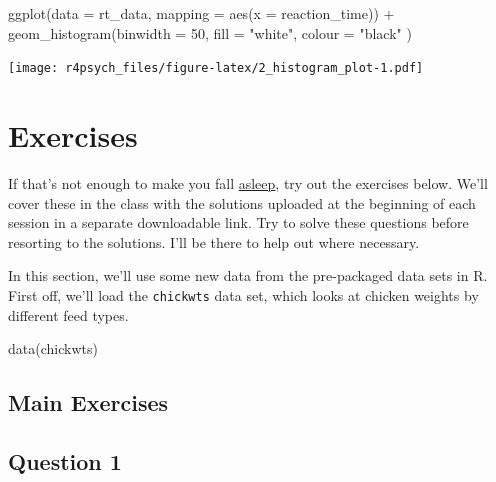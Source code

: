 \documentclass[
]{book}
\newenvironment{Shaded}{\begin{snugshade}}{\end{snugshade}}
\newcommand{\AttributeTok}[1]{\textcolor[rgb]{0.77,0.63,0.00}{#1}}
\newcommand{\DecValTok}[1]{\textcolor[rgb]{0.00,0.00,0.81}{#1}}
\newcommand{\FunctionTok}[1]{\textcolor[rgb]{0.00,0.00,0.00}{#1}}
\newcommand{\NormalTok}[1]{#1}
\newcommand{\SpecialCharTok}[1]{\textcolor[rgb]{0.00,0.00,0.00}{#1}}
\newcommand{\StringTok}[1]{\textcolor[rgb]{0.31,0.60,0.02}{#1}}
\begin{document}
\begin{Shaded}
\begin{Highlighting}[]
\FunctionTok{ggplot}\NormalTok{(}\AttributeTok{data =}\NormalTok{ rt\_data, }\AttributeTok{mapping =} \FunctionTok{aes}\NormalTok{(}\AttributeTok{x =}\NormalTok{ reaction\_time)) }\SpecialCharTok{+}
  \FunctionTok{geom\_histogram}\NormalTok{(}\AttributeTok{binwidth =} \DecValTok{50}\NormalTok{, }
                 \AttributeTok{fill =} \StringTok{"white"}\NormalTok{, }
                 \AttributeTok{colour =} \StringTok{"black"}
\NormalTok{                 )}
\end{Highlighting}
\end{Shaded}

\texttt{[image: r4psych\_files/figure-latex/2\_histogram\_plot-1.pdf]}

\hypertarget{exercises-1}{%
\section{Exercises}\label{exercises-1}}

If that's not enough to make you fall \href{https://youtu.be/hO-UyFL5cxY}{asleep}, try out the exercises below. We'll cover these in the class with the solutions uploaded at the beginning of each session in a separate downloadable link. Try to solve these questions before resorting to the solutions. I'll be there to help out where necessary.

In this section, we'll use some new data from the pre-packaged data sets in R. First off, we'll load the \texttt{chickwts} data set, which looks at chicken weights by different feed types.

\begin{Shaded}
\begin{Highlighting}[]
\FunctionTok{data}\NormalTok{(chickwts)}
\end{Highlighting}
\end{Shaded}

\hypertarget{main-exercises}{%
\subsection{Main Exercises}\label{main-exercises}}

\hypertarget{question-1-1}{%
\subsection{Question 1}\label{question-1-1}}
\end{document}
